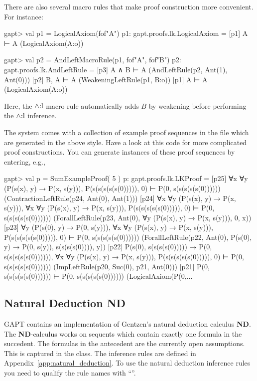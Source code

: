 \documentclass[a4paper,11pt]{book}
\renewcommand{\land}{\wedge}
\newcommand{\ND}{\textbf{ND}}
\newcommand{\mt}[1]{\textnormal{#1}}
\newcommand{\cli}[1]{{\ttfamily {#1}}}
\begin{document}
There are also several macro rules that make proof construction more convenient.
For instance:
\begin{clilisting}
gapt> val p1 = LogicalAxiom(fof"A")
p1: gapt.proofs.lk.LogicalAxiom =
[p1] A ⊢ A    (LogicalAxiom(A:o))

gapt> val p2 = AndLeftMacroRule(p1, fof"A", fof"B")
p2: gapt.proofs.lk.AndLeftRule =
[p3] A ∧ B ⊢ A    (AndLeftRule(p2, Ant(1), Ant(0)))
[p2] B, A ⊢ A    (WeakeningLeftRule(p1, B:o))
[p1] A ⊢ A    (LogicalAxiom(A:o))

\end{clilisting}
Here, the $\land\mt{:l}$ macro rule automatically adds $B$ by weakening before
performing the $\land\mt{:l}$ inference.

The system comes with a collection of example proof sequences in the file
\cli{examples/ProofSequences.scala} which are generated in the above style.
Have a look at this code for more complicated proof constructions.
You can generate instances of these proof sequences by entering, e.g.,
\begin{clilisting}
gapt> val p = SumExampleProof( 5 )
p: gapt.proofs.lk.LKProof =
[p25] ∀x ∀y (P(s(x), y) → P(x, s(y))), P(s(s(s(s(s(0))))), 0) ⊢ P(0, s(s(s(s(s(0))))))    (ContractionLeftRule(p24, Ant(0), Ant(1)))
[p24] ∀x ∀y (P(s(x), y) → P(x, s(y))),
∀x ∀y (P(s(x), y) → P(x, s(y))),
P(s(s(s(s(s(0))))), 0)
⊢
P(0, s(s(s(s(s(0))))))    (ForallLeftRule(p23, Ant(0), ∀y (P(s(x), y) → P(x, s(y))), 0, x))
[p23] ∀y (P(s(0), y) → P(0, s(y))),
∀x ∀y (P(s(x), y) → P(x, s(y))),
P(s(s(s(s(s(0))))), 0)
⊢
P(0, s(s(s(s(s(0))))))    (ForallLeftRule(p22, Ant(0), P(s(0), y) → P(0, s(y)), s(s(s(s(0)))), y))
[p22] P(s(0), s(s(s(s(0))))) → P(0, s(s(s(s(s(0)))))),
∀x ∀y (P(s(x), y) → P(x, s(y))),
P(s(s(s(s(s(0))))), 0)
⊢
P(0, s(s(s(s(s(0))))))    (ImpLeftRule(p20, Suc(0), p21, Ant(0)))
[p21] P(0, s(s(s(s(s(0)))))) ⊢ P(0, s(s(s(s(s(0))))))    (LogicalAxiom(P(0,...

\end{clilisting}

\subsection{Natural Deduction ND}

GAPT contains an implementation of Gentzen's natural deduction calculus {\ND}.
The {\ND}-calculus works on sequents which contain exactly one formula in the succedent.
The formulas in the antecedent are the currently open assumptions. This is captured
in the \cli{NDSequent} class. The inference rules are defined in Appendix~\ref{app:natural_deduction}.
To use the natural deduction inference rules you need to qualify the rule names with ``\cli{nd.}''.
\end{document}
